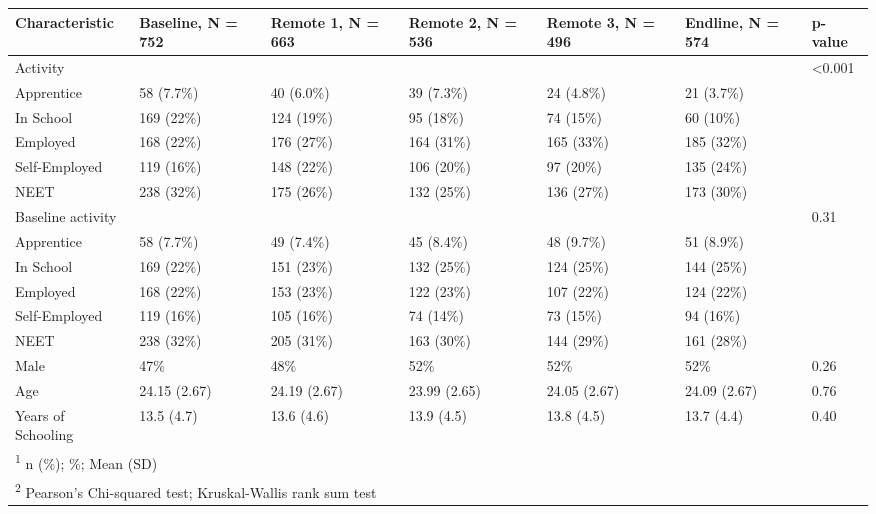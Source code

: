 
\begin{tabular}{lllllll}
\toprule
Characteristic & Baseline, N = 752 & Remote 1, N = 663 & Remote 2, N = 536 & Remote 3, N = 496 & Endline, N = 574 & p-value\\
\midrule
Activity &  &  &  &  &  & <0.001\\
\hspace{1em}Apprentice & 58 (7.7\%) & 40 (6.0\%) & 39 (7.3\%) & 24 (4.8\%) & 21 (3.7\%) & \\
\hspace{1em}In School & 169 (22\%) & 124 (19\%) & 95 (18\%) & 74 (15\%) & 60 (10\%) & \\
\hspace{1em}Employed & 168 (22\%) & 176 (27\%) & 164 (31\%) & 165 (33\%) & 185 (32\%) & \\
\hspace{1em}Self-Employed & 119 (16\%) & 148 (22\%) & 106 (20\%) & 97 (20\%) & 135 (24\%) & \\
\hspace{1em}NEET & 238 (32\%) & 175 (26\%) & 132 (25\%) & 136 (27\%) & 173 (30\%) & \\
Baseline activity &  &  &  &  &  & 0.31\\
\hspace{1em}Apprentice & 58 (7.7\%) & 49 (7.4\%) & 45 (8.4\%) & 48 (9.7\%) & 51 (8.9\%) & \\
\hspace{1em}In School & 169 (22\%) & 151 (23\%) & 132 (25\%) & 124 (25\%) & 144 (25\%) & \\
\hspace{1em}Employed & 168 (22\%) & 153 (23\%) & 122 (23\%) & 107 (22\%) & 124 (22\%) & \\
\hspace{1em}Self-Employed & 119 (16\%) & 105 (16\%) & 74 (14\%) & 73 (15\%) & 94 (16\%) & \\
\hspace{1em}NEET & 238 (32\%) & 205 (31\%) & 163 (30\%) & 144 (29\%) & 161 (28\%) & \\
Male & 47\% & 48\% & 52\% & 52\% & 52\% & 0.26\\
Age & 24.15 (2.67) & 24.19 (2.67) & 23.99 (2.65) & 24.05 (2.67) & 24.09 (2.67) & 0.76\\
Years of Schooling & 13.5 (4.7) & 13.6 (4.6) & 13.9 (4.5) & 13.8 (4.5) & 13.7 (4.4) & 0.40\\
\bottomrule
\multicolumn{7}{l}{\rule{0pt}{1em}\textsuperscript{1} n (\%); \%; Mean (SD)}\\
\multicolumn{7}{l}{\rule{0pt}{1em}\textsuperscript{2} Pearson's Chi-squared test; Kruskal-Wallis rank sum test}\\
\end{tabular}
